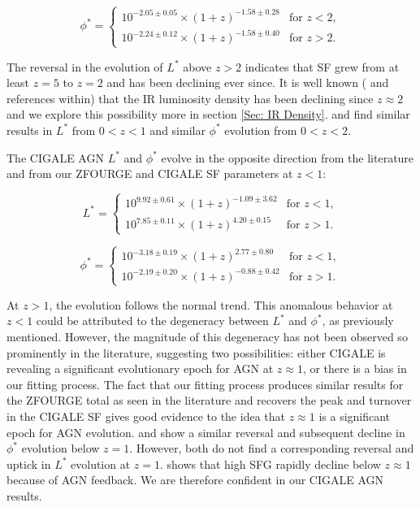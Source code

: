 \begin{equation*}
    \phi^{*} =
    \begin{cases} 
        10^{-2.05 \pm 0.05} \times (1+z)^{-1.58 \pm 0.28} & \text{for } z < 2, \\
        10^{-2.24 \pm 0.12} \times (1+z)^{-1.58 \pm 0.40} & \text{for } z > 2.
    \end{cases}
\end{equation*}

The reversal in the evolution of $L^{*}$ above $z>2$ indicates that SF grew from at least $z=5$ to $z=2$ and has been declining ever since. It is well known (\citealp{gruppioni_herschel_2013,  madau_cosmic_2014} and references within) that the IR luminosity density has been declining since $z\approx2$ and we explore this possibility more in section \ref{Sec: IR Density}. \cite{gruppioni_herschel_2013} and \cite{magnelli_deepest_2013} find similar results in $L^{*}$ from $0<z<1$ and similar $\phi^{*}$ evolution from $0<z<2$.

The CIGALE AGN $L^{*}$ and $\phi^{*}$ evolve in the opposite direction from the literature and from our ZFOURGE and CIGALE SF parameters at $z<1$:

\begin{equation*}
    L^{*} =
    \begin{cases} 
        10^{9.92 \pm 0.61} \times (1+z)^{-1.09 \pm 3.62} & \text{for } z < 1, \\
        10^{7.85 \pm 0.11} \times (1+z)^{4.20 \pm 0.15} & \text{for } z > 1.
    \end{cases}
\end{equation*}

\begin{equation*}
    \phi^{*} =
    \begin{cases} 
        10^{-3.18 \pm 0.19} \times (1+z)^{2.77 \pm 0.80} & \text{for } z < 1, \\
        10^{-2.19 \pm 0.20} \times (1+z)^{-0.88 \pm 0.42} & \text{for } z > 1.
    \end{cases}
\end{equation*}

At $z>1$, the evolution follows the normal trend. This anomalous behavior at $z<1$ could be attributed to the degeneracy between $L^{*}$ and $\phi^{*}$, as previously mentioned. However, the magnitude of this degeneracy has not been observed so prominently in the literature, suggesting two possibilities: either CIGALE is revealing a significant evolutionary epoch for AGN at $z\approx1$, or there is a bias in our fitting process. The fact that our fitting process produces similar results for the ZFOURGE total as seen in the literature and recovers the peak and turnover in the CIGALE SF gives good evidence to the idea that $z\approx1$ is a significant epoch for AGN evolution. \cite{delvecchio_tracing_2014} and \cite{hopkins_observational_2007} show a similar reversal and subsequent decline in $\phi^{*}$ evolution below $z=1$. However, both do not find a corresponding reversal and uptick in $L^{*}$ evolution at $z=1$. \cite{katsianis_evolution_2017} shows that high SFG rapidly decline below $z\approx1$ because of AGN feedback. We are therefore confident in our CIGALE AGN results. 


